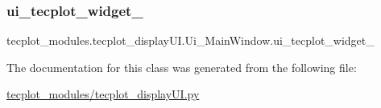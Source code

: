 \subsubsection{\texorpdfstring{ui\+\_\+tecplot\+\_\+widget\+\_}{ui\_tecplot\_widget\_2}}
{\footnotesize\ttfamily tecplot\+\_\+modules.\+tecplot\+\_\+display\+U\+I.\+Ui\+\_\+\+Main\+Window.\+ui\+\_\+tecplot\+\_\+widget\+\_}



The documentation for this class was generated from the following file\+:\begin{DoxyCompactItemize}
\item 
\hyperlink{tecplot__modules_2tecplot__display_u_i_8py}{tecplot\+\_\+modules/tecplot\+\_\+display\+U\+I.\+py}\end{DoxyCompactItemize}
